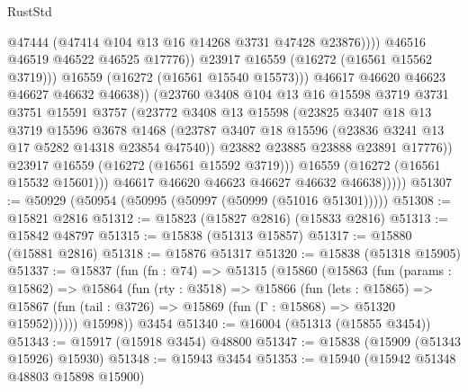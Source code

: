 \begin{lexlean}{RustStd}
\begin{coremodule}
                                  @47444
                                  (@47414 @104 @13 @16 @14268 @3731 @47428 @23876))))
                            @46516
                            @46519
                            @46522
                            @46525
                            @17776))
                        @23917
                        @16559
                        (@16272 (@16561 @15562 @3719)))
                      @16559
                      (@16272 (@16561 @15540 @15573)))
                    @46617
                    @46620
                    @46623
                    @46627
                    @46632
                    @46638))
                (@23760
                  @3408
                  @104
                  @13
                  @16
                  @15598
                  @3719
                  @3731
                  @3751
                  @15591
                  @3757
                  (@23772
                    @3408
                    @13
                    @15598
                    (@23825
                      @3407
                      @18
                      @13
                      @3719
                      @15596
                      @3678
                      @1468
                      (@23787 @3407 @18 @15596 (@23836 @3241 @13 @17 @5282 @14318 @23854 @47540))
                      @23882
                      @23885
                      @23888
                      @23891
                      @17776))
                  @23917
                  @16559
                  (@16272 (@16561 @15592 @3719)))
                @16559
                (@16272 (@16561 @15532 @15601)))
              @46617
              @46620
              @46623
              @46627
              @46632
              @46638)))))
@51307 := @50929 (@50954 (@50995 (@50997 (@50999 (@51016 @51301)))))
@51308 := @15821 @2816
@51312 := @15823 (@15827 @2816) (@15833 @2816)
@51313 := @15842 @48797
@51315 := @15838 (@51313 @15857)
@51317 := @15880 (@15881 @2816)
@51318 := @15876 @51317
@51320 := @15838 (@51318 @15905)
@51337 := @15837
    (fun (fn : @74) =>
    @51315
      (@15860
        (@15863
          (fun (params : @15862) =>
          @15864
            (fun (rty : @3518) =>
            @15866
              (fun (lets : @15865) =>
              @15867 (fun (tail : @3726) => @15869 (fun (Γ : @15868) => @51320 @15952))))))
        @15998))
    @3454
@51340 := @16004 (@51313 (@15855 @3454))
@51343 := @15917 (@15918 @3454) @48800
@51347 := @15838 (@15909 (@51343 @15926) @15930)
@51348 := @15943 @3454
@51353 := @15940 (@15942 @51348 @48803 @15898 @15900)

\end{coremodule}
\end{lexlean}
